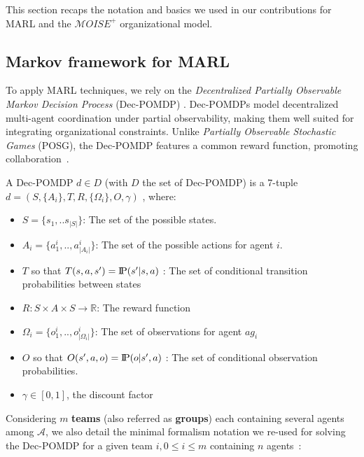\documentclass[pdflatex,sn-mathphys-num]{sn-jnl}%
\newcommand{\probP}{\text{I\kern-0.15em P}}
\theoremstyle{thmstyleone}%
\theoremstyle{thmstyletwo}%
\theoremstyle{thmstylethree}%
\begin{document}
This section recaps the notation and basics we used in our contributions for MARL and the $\mathcal{M}OISE^+$ organizational model.

\subsection{Markov framework for MARL}

To apply MARL techniques, we rely on the \textit{Decentralized Partially Observable Markov Decision Process} (Dec-POMDP) \cite{Oliehoek2016}. Dec-POMDPs model decentralized multi-agent coordination under partial observability, making them well suited for integrating organizational constraints. Unlike \textit{Partially Observable Stochastic Games} (POSG), the Dec-POMDP features a common reward function, promoting collaboration~\cite{Matignon2007}.

A Dec-POMDP $d \in D$ (with $D$ the set of Dec-POMDP) is a 7-tuple $d = (S,\{A_i\},T,R,\{\Omega_i\},O,\gamma)$ , where:
\begin{itemize}
    \item $S = \{s_1, ..s_{|S|}\}$: The set of the possible states.
    \item $A_{i} = \{a_{1}^{i},..,a_{|A_{i}|}^{i}\}$: The set of the possible actions for agent $i$.
    \item $T$ so that $T(s,a,s') = \probP{(s'|s,a)}$ : The set of conditional transition probabilities between states
    \item $R: S \times A \times S \rightarrow \mathbb{R}$: The reward function
    \item $\Omega_{i} = \{o_{1}^{i},..,o_{|\Omega_{i}|}^{i}\}$: The set of observations for agent $ag_i$
    \item $O$ so that $O(s',a,o) = \probP{(o|s',a)}$ : The set of conditional observation probabilities.
    \item $\gamma \in [0,1]$, the discount factor
\end{itemize}

Considering $m$ \textbf{teams} (also referred as \textbf{groups}) each containing several agents among $\mathcal{A}$, we also detail the minimal formalism notation we re-used for solving the Dec-POMDP for a given team $i, 0 \leq i \leq m$ containing $n$ agents~\cite{Matignon2007,Yuan2023}:
\end{document}
